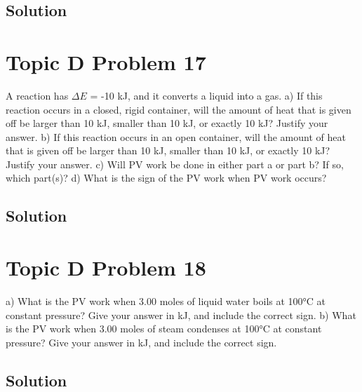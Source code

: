 \documentclass[10pt]{article}
\begin{document}
        \subsection{Solution}

    \pagebreak
    \section{Topic D Problem 17}
        A reaction has $\Delta E$ = -10 kJ, and it converts a liquid into a gas.
a) If this reaction occurs in a closed, rigid container, will the amount of heat that is given off
be larger than 10 kJ, smaller than 10 kJ, or exactly 10 kJ? Justify your answer.
b) If this reaction occurs in an open container, will the amount of heat that is given off be
larger than 10 kJ, smaller than 10 kJ, or exactly 10 kJ? Justify your answer.
c) Will PV work be done in either part a or part b? If so, which part(s)?
d) What is the sign of the PV work when PV work occurs?
        
        \subsection{Solution}

    \pagebreak
    \section{Topic D Problem 18}
        a) What is the PV work when 3.00 moles of liquid water boils at 100\unit{\celsius} at constant pressure?
Give your answer in kJ, and include the correct sign.
b) What is the PV work when 3.00 moles of steam condenses at 100\unit{\celsius} at constant pressure?
Give your answer in kJ, and include the correct sign.

        
        \subsection{Solution}

    \pagebreak
\end{document}
